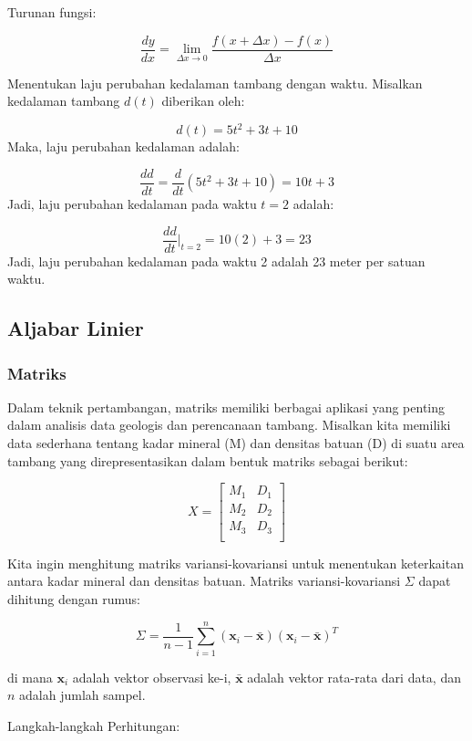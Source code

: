 \documentclass[
]{book}
\begin{document}
Turunan fungsi:

\[
  \frac{dy}{dx} = \lim_{\Delta x \to 0} \frac{f(x + \Delta x) - f(x)}{\Delta x}
\]

Menentukan laju perubahan kedalaman tambang dengan waktu. Misalkan kedalaman tambang \(d(t)\) diberikan oleh:

\[
  d(t) = 5t^2 + 3t + 10
\]
Maka, laju perubahan kedalaman adalah:

\[
  \frac{dd}{dt} = \frac{d}{dt} (5t^2 + 3t + 10) = 10t + 3
\]
Jadi, laju perubahan kedalaman pada waktu \(t = 2\) adalah:

\[
  \frac{dd}{dt} \bigg|_{t=2} = 10(2) + 3 = 23
\]
Jadi, laju perubahan kedalaman pada waktu 2 adalah 23 meter per satuan waktu.

\subsection{Aljabar Linier}\label{aljabar-linier-1}

\subsubsection*{Matriks}\label{matriks}

Dalam teknik pertambangan, matriks memiliki berbagai aplikasi yang penting dalam analisis data geologis dan perencanaan tambang. Misalkan kita memiliki data sederhana tentang kadar mineral (M) dan densitas batuan (D) di suatu area tambang yang direpresentasikan dalam bentuk matriks sebagai berikut:

\[
X = \begin{bmatrix}
M_1 & D_1 \\
M_2 & D_2 \\
M_3 & D_3 \\
\end{bmatrix}
\]

Kita ingin menghitung matriks variansi-kovariansi untuk menentukan keterkaitan antara kadar mineral dan densitas batuan. Matriks variansi-kovariansi \(\Sigma\) dapat dihitung dengan rumus:

\[ 
\Sigma = \frac{1}{n-1} \sum_{i=1}^{n} (\mathbf{x}_i - \bar{\mathbf{x}}) (\mathbf{x}_i - \bar{\mathbf{x}})^T 
\]

di mana \(\mathbf{x}_i\) adalah vektor observasi ke-i, \(\bar{\mathbf{x}}\) adalah vektor rata-rata dari data, dan \(n\) adalah jumlah sampel.

Langkah-langkah Perhitungan:
\end{document}
